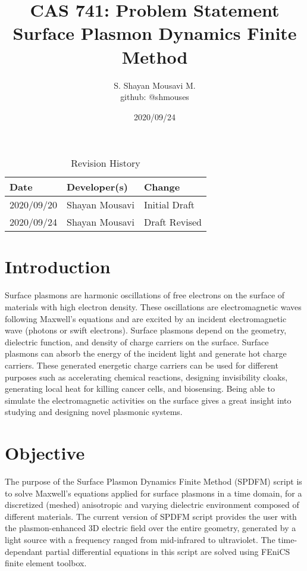 \documentclass{article} \usepackage{tabularx} \usepackage{booktabs}
\title{CAS 741: Problem Statement\\Surface Plasmon Dynamics Finite Method}
\author{S. Shayan Mousavi M.\\github: @shmouses}
\date{2020/09/24}
\begin{document}
	
	\maketitle \clearpage
	
	
	\begin{table}[hp] \caption{Revision History} \label{TblRevisionHistory}
		\begin{tabularx}{\textwidth}{llX} \toprule \textbf{Date} &
			\textbf{Developer(s)} & \textbf{Change}\\ \midrule 2020/09/20 & Shayan Mousavi
			& Initial Draft\\ 2020/09/24 & Shayan Mousavi & Draft Revised\\ \bottomrule
	\end{tabularx} \end{table}
	
	
	
	\clearpage
	
	
	\newpage
	
	
	\newcommand*\apos{\textsc{\char13}} \section{Introduction}
	
	Surface plasmons are harmonic oscillations of free electrons on the surface of
	materials with high electron density. These oscillations are electromagnetic
	waves following Maxwell's equations and are excited by an incident
	electromagnetic wave (photons or swift electrons). Surface plasmons depend on
	the geometry, dielectric function, and density of charge carriers on the
	surface. Surface plasmons can absorb the energy of the incident light and
	generate hot charge carriers. These generated energetic charge carriers can be
	used for different purposes such as accelerating chemical reactions, designing
	invisibility cloaks, generating local heat for killing cancer cells, and
	biosensing. Being able to simulate the electromagnetic activities on the
	surface gives a great insight into studying and designing novel plasmonic
	systems.
	
	
	\section{Objective}
	
	The purpose of the Surface Plasmon Dynamics Finite Method (SPDFM) script is to
	solve Maxwell's equations applied for surface plasmons in a time domain, for a
	discretized (meshed) anisotropic and varying dielectric environment composed of
	different materials. The current version of SPDFM script provides the user with
	the plasmon-enhanced 3D electric field over the entire geometry, generated by a
	light source with a frequency ranged from mid-infrared to ultraviolet. The
	time-dependant partial differential equations in this script are solved using
	FEniCS finite element toolbox.
	
\end{document}
